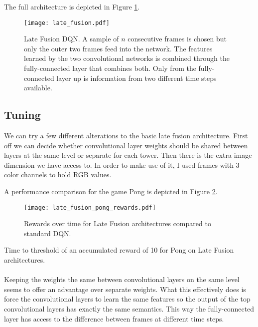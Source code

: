 The full architecture is depicted in Figure \ref{fig:late_fusion}.

\begin{figure}[htpb]
  \centering
  \texttt{[image: late\_fusion.pdf]}
  \caption[Late Fusion]{
    Late Fusion DQN.
    A sample of $n$ consecutive frames is chosen
    but only the outer two frames
    feed into the network.
    The features learned by the two convolutional networks
    is combined through the fully-connected layer
    that combines both.
    Only from the fully-connected layer up
    is information from two different time steps available.
  }
  \label{fig:late_fusion}
\end{figure}

\subsection{Tuning}
\label{sub:late_fusion_tuning}
We can try a few different alterations to the basic late fusion architecture.
First off we can decide whether convolutional layer weights should be shared
between layers at the same level
or separate for each tower.
Then there is the extra image dimension we have access to.
In order to make use of it,
I used frames with 3 color channels
to hold RGB values.

A performance comparison for the game Pong is depicted in
Figure \ref{fig:late_fusion_pong_rewards}.

\begin{figure}[htpb]
  \centering
  \texttt{[image: late\_fusion\_pong\_rewards.pdf]}
  \caption[Late Fusion rewards over time]{
    Rewards over time for Late Fusion architectures
    compared to standard DQN.}
  \label{fig:late_fusion_pong_rewards}
\end{figure}

\begin{table}[htpb]
  \center
  \renewcommand{\arraystretch}{1.3}
  
  \caption[Late Fusion time to threshold]{
    Time to threshold
    of an accumulated reward of 10
    for Pong
    on Late Fusion architectures.
  }
\end{table}

\paragraph{}
Keeping the weights the same between convolutional layers on the same level
seems to offer an advantage over separate weights.
What this effectively does
is force the convolutional layers to learn the same features
so the output of the top convolutional layers
has exactly the same semantics.
This way the fully-connected layer has access
to the difference between frames at different time steps.

